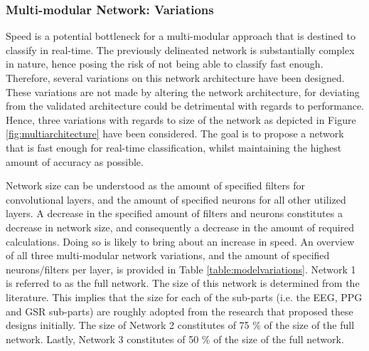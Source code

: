\documentclass[12pt]{article}
\begin{document}
\subsubsection{Multi-modular Network: Variations}
Speed is a potential bottleneck for a multi-modular approach that is destined to classify in real-time. The previously delineated network is substantially complex in nature, hence posing the risk of not being able to classify fast enough. Therefore, several variations on this network architecture have been designed. These variations are not made by altering the network architecture, for deviating from the validated architecture could be detrimental with regards to performance. Hence, three variations with regards to size of the network as depicted in Figure \ref{fig:multiarchitecture} have been considered. The goal is to propose a network that is fast enough for real-time classification, whilst maintaining the highest amount of accuracy as possible. 

Network size can be understood as the amount of specified filters for convolutional layers, and the amount of specified neurons for all other utilized layers. A decrease in the specified amount of filters and neurons constitutes a decrease in network size, and consequently a decrease in the amount of required calculations. Doing so is likely to bring about an increase in speed. An overview of all three multi-modular network variations, and the amount of specified neurons/filters per layer, is provided in Table \ref{table:modelvariations}. Network 1 is referred to as the full network. The size of this network is determined from the literature. This implies that the size for each of the sub-parts (i.e. the EEG, PPG and GSR sub-parts) are roughly adopted from the research that proposed these designs initially. The size of Network 2 constitutes of 75 \% of the size of the full network. Lastly, Network 3 constitutes of 50 \% of the size of the full network.
\end{document}
